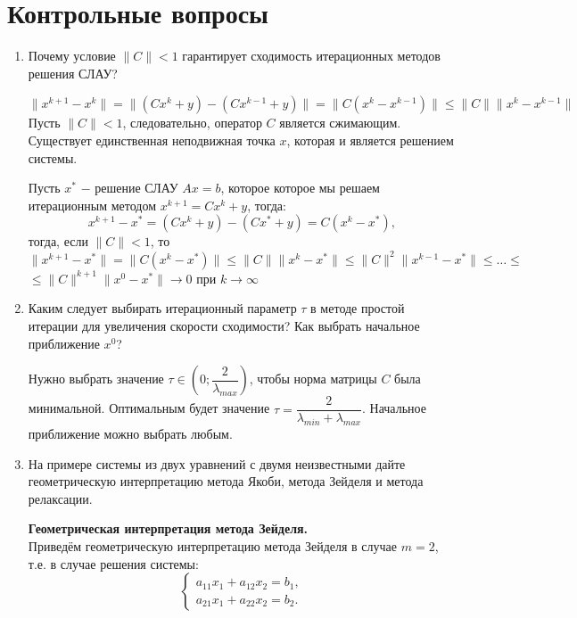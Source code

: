 \documentclass[12pt, a4paper]{article}
\begin{document}
\section{Контрольные вопросы}
\begin{enumerate}
\item Почему условие $\|C\| < 1$ гарантирует сходимость итерационных методов решения СЛАУ?
 
$\|x^{k+1}-x^{k}\|=\|(Cx^{k}+y)-(Cx^{k-1}+y)\|=\|C(x^{k}-x^{k-1})\| \leq \|C\| \|x^{k}-x^{k-1}\|$
Пусть $\|C\| < 1$, следовательно, оператор $C$ является сжимающим. 
Существует единственная неподвижная точка $x$, которая и является решением системы. 

Пусть $x^{*}$ $-$ решение СЛАУ $Ax=b$, которое которое мы решаем итерационным методом $x^{k+1}=Cx^{k}+y$, тогда:\\
$$x^{k+1}-x^{*}=(Cx^{k}+y)-(Cx^{*}+y)=C(x^{k}-x^{*}),$$
тогда, если $\|C\| < 1$, то\\
 $\|x^{k+1}-x^{*}\| = \|C(x^{k}-x^{*})\| \leq \|C\|\|x^{k}-x^{*}\| \leq \|C\|^{2} \|x^{k-1}-x^{*}\| \leq \ldots \leq $\\
$\leq \|C\|^{k+1}\|x^{0}-x^{*}\| \rightarrow 0$ при $ k \to \infty$
\\

\item Каким следует выбирать итерационный параметр $\tau$ в методе простой итерации для увеличения скорости сходимости? Как выбрать начальное приближение $x^{0}$?

Нужно выбрать значение $\tau \in (0; \dfrac{2}{\lambda_{max}})$, чтобы норма матрицы $C$ была минимальной. Оптимальным будет значение $\tau = \dfrac{2}{\lambda_{min} + \lambda_{max}}$. Начальное приближение можно выбрать любым.

\item На примере системы из двух уравнений с двумя неизвестными дайте геометрическую интерпретацию метода Якоби, метода Зейделя и метода релаксации.

 \textbf{Геометрическая интерпретация метода Зейделя.}\\
Приведём геометрическую интерпретацию метода Зейделя в случае $m=2$, т.е. в случае решения системы:\\
 \begin{equation*}
 \begin{cases}
  a_{11}x_{1}+a_{12}x_{2}=b_{1},\\
  a_{21}x_{1}+a_{22}x_{2}=b_{2}.
 \end{cases}
\end{equation*}


\end{enumerate}
\end{document}
